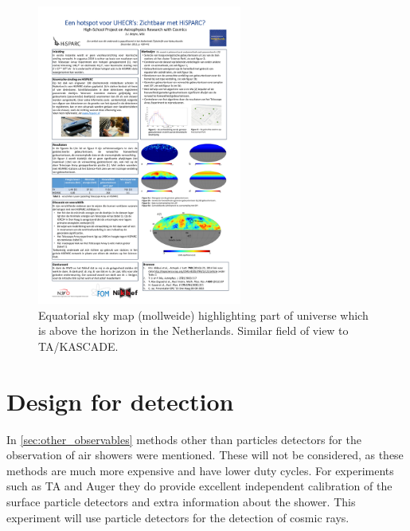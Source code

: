 \begin{figure}
    \centering
    \includegraphics[width=0.6\textwidth]
                    {plots/experiment/visible_sky_map}
    \caption{Equatorial sky map (mollweide) highlighting part of universe which is above the horizon in the Netherlands. Similar field of view to TA/KASCADE.}
    \label{fig:visible_sky_map}
\end{figure}


\section{Design for detection}

In \cref{sec:other_observables} methods other than particles detectors for the observation of air showers were mentioned. These will not be considered, as these methods are much more expensive and have lower duty cycles. For experiments such as TA and Auger they do provide excellent independent calibration of the surface particle detectors and extra information about the shower. This experiment will use particle detectors for the detection of cosmic rays.

